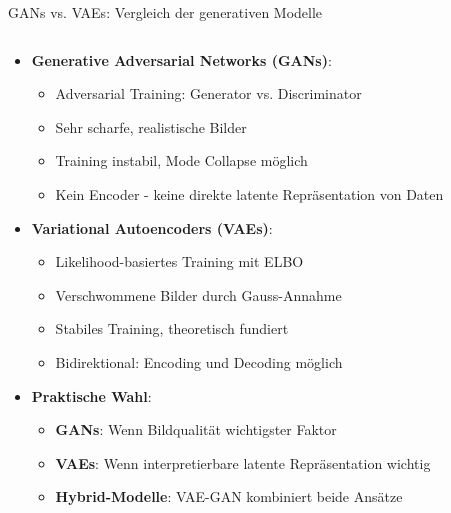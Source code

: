 \documentclass[aspectratio=1610, xcolor=dvipsnames, 9pt]{beamer}
\begin{document}
\begin{frame}{GANs vs. VAEs: Vergleich der generativen Modelle}
  \begin{columns}
    \begin{column}{1\textwidth}
      \begin{itemize}
        \item \textbf{Generative Adversarial Networks (GANs)}:
        \begin{itemize}
          \item Adversarial Training: Generator vs. Discriminator
          \item Sehr scharfe, realistische Bilder
          \item Training instabil, Mode Collapse möglich
          \item Kein Encoder - keine direkte latente Repräsentation von Daten
        \end{itemize}
        \item \textbf{Variational Autoencoders (VAEs)}:
        \begin{itemize}
          \item Likelihood-basiertes Training mit ELBO
          \item Verschwommene Bilder durch Gauss-Annahme
          \item Stabiles Training, theoretisch fundiert
          \item Bidirektional: Encoding und Decoding möglich
        \end{itemize}
        \item \textbf{Praktische Wahl}:
        \begin{itemize}
          \item \textbf{GANs}: Wenn Bildqualität wichtigster Faktor
          \item \textbf{VAEs}: Wenn interpretierbare latente Repräsentation wichtig
          \item \textbf{Hybrid-Modelle}: VAE-GAN kombiniert beide Ansätze
        \end{itemize}
      \end{itemize}
    \end{column}
  \end{columns}
\end{frame} 
\end{document}

